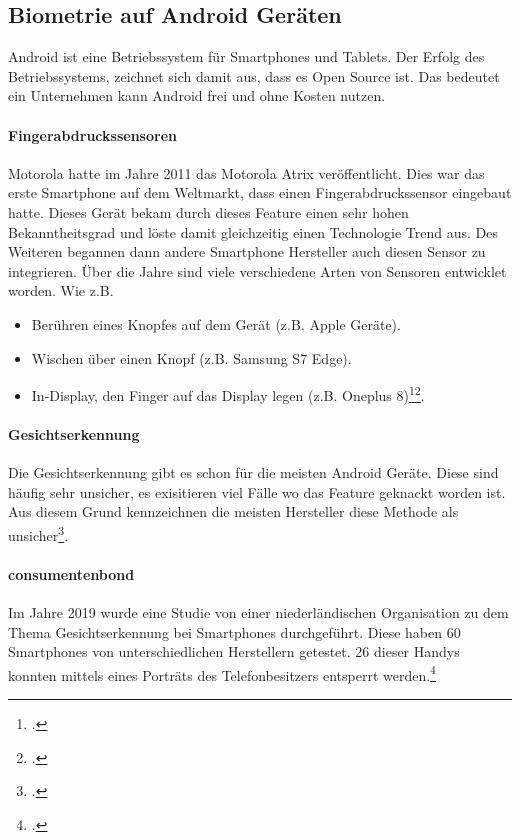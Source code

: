 \subsection{Biometrie auf Android Geräten}
Android ist eine Betriebssystem für Smartphones und Tablets. Der Erfolg des Betriebssystems, zeichnet sich damit aus, dass es Open Source ist. Das bedeutet ein Unternehmen kann Android frei und ohne Kosten nutzen.
\paragraph{Fingerabdruckssensoren}
Motorola hatte im Jahre 2011 das Motorola Atrix veröffentlicht. Dies war das erste Smartphone auf dem Weltmarkt, dass einen Fingerabdruckssensor eingebaut hatte.
Dieses Gerät bekam durch dieses Feature einen sehr hohen Bekanntheitsgrad und löste damit gleichzeitig einen Technologie Trend aus.
Des Weiteren begannen dann andere Smartphone Hersteller auch diesen Sensor zu integrieren.
Über die Jahre sind viele verschiedene Arten von Sensoren entwicklet worden. Wie z.B.
\begin{itemize}
	\item Berühren eines Knopfes auf dem Gerät (z.B. Apple Geräte).
	\item Wischen über einen Knopf (z.B. Samsung S7 Edge).
	\item In-Display, den Finger auf das Display legen (z.B. Oneplus 8)\footcite{fingerabdruck-android-1}\footcite{fingerabdruck-android-2}. 
\end{itemize}
\paragraph{Gesichtserkennung}
Die Gesichtserkennung gibt es schon für die meisten Android Geräte. Diese sind häufig sehr unsicher, es exisitieren viel Fälle wo das Feature geknackt worden ist. Aus diesem Grund kennzeichnen die meisten Hersteller diese Methode als unsicher\footcite{gesichtserkennung-android}. 

\paragraph{consumentenbond}
Im Jahre 2019 wurde eine Studie von einer niederländischen Organisation zu dem Thema Gesichtserkennung bei Smartphones durchgeführt. 
Diese haben 60 Smartphones von unterschiedlichen Herstellern getestet. 26 dieser Handys konnten mittels eines Porträts des Telefonbesitzers entsperrt werden.\footcite{consumentenbond}

